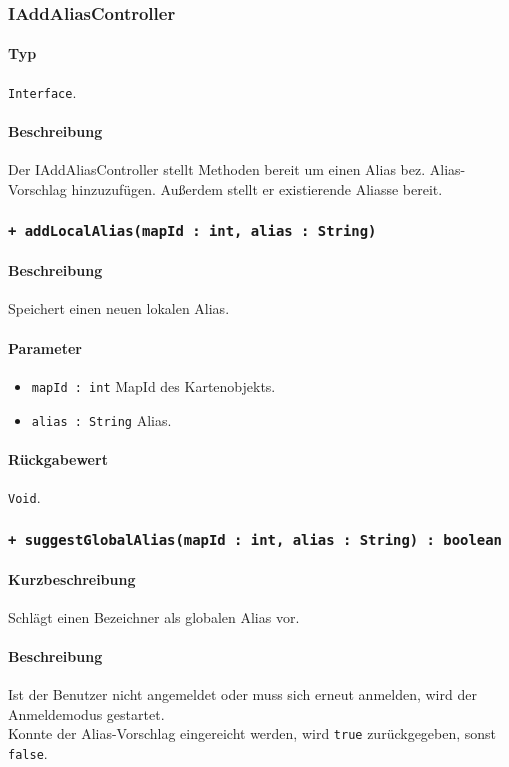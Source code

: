 \subsubsection{IAddAliasController}
\paragraph*{Typ}
\texttt{Interface}.
\paragraph*{Beschreibung}
Der IAddAliasController stellt Methoden bereit um einen Alias bez. Alias-Vorschlag hinzuzufügen. 
Außerdem stellt er existierende Aliasse bereit.

\subsubsection*{\texttt{+ addLocalAlias(mapId : int, alias : String)}}%
\paragraph*{Beschreibung}
Speichert einen neuen lokalen Alias.
\paragraph*{Parameter}
\begin{itemize}
    \item \texttt{mapId : int} MapId des Kartenobjekts.
    \item \texttt{alias : String} Alias.
\end{itemize}
\paragraph*{Rückgabewert}
\texttt{Void}.

\subsubsection*{\texttt{+ suggestGlobalAlias(mapId : int, alias : String) : boolean}}%
\paragraph*{Kurzbeschreibung}
Schlägt einen Bezeichner als globalen Alias vor.
\paragraph*{Beschreibung}
Ist der Benutzer nicht angemeldet oder muss sich erneut anmelden, wird der Anmeldemodus gestartet.\\
Konnte der Alias-Vorschlag eingereicht werden, wird \texttt{true} zurückgegeben, sonst \texttt{false}.
